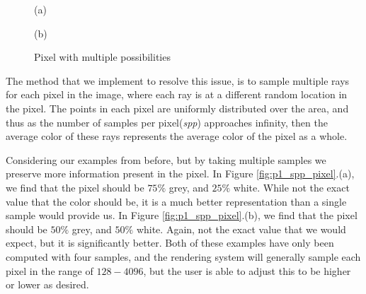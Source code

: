 \documentclass[../pbr.tex]{subfile}
\begin{document}
\begin{figure}[htpb]
  \begin{center}
    \begin{minipage}{0.45\textwidth}
      \begin{center}

        (a)
      \end{center}
    \end{minipage}
    \begin{minipage}{0.45\textwidth}
      \begin{center}

        (b)
      \end{center}
    \end{minipage}
  \end{center}
  \caption{Pixel with multiple possibilities}%
  \label{fig:p1_pixel}
\end{figure}

The method that we implement to resolve this issue, is to sample multiple rays
for each pixel in the image, where each ray is at a different random location
in the pixel. The points in each pixel are uniformly distributed over the area,
and thus as the number of samples per pixel(\textit{spp}) approaches infinity,
then the average color of these rays represents the average color of the pixel
as a whole.

Considering our examples from before, but by taking multiple
samples we preserve more information present in the pixel. In Figure
\ref{fig:p1_spp_pixel}.(a), we find that the pixel should be $75\%$ grey, and
$25\%$ white. While not the exact value that the color should be, it is a much
better representation than a single sample would provide us. In Figure
\ref{fig:p1_spp_pixel}.(b), we find that the pixel should be $50\%$ grey, and
$50\%$ white. Again, not the exact value that we would expect, but it is
significantly better. Both of these examples have only been computed with four
samples, and the rendering system will generally sample each pixel in the range
of $128-4096$, but the user is able to adjust this to be higher or lower as
desired.
\end{document}
